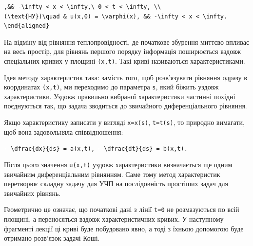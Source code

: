 \documentclass[
  ukrainian,
]{article}
\begin{document}
\begin{verbatim}
,&& -\infty < x < \infty,\ 0 < t < \infty, \\
(\text{НУ})\quad & u(x,0) = \varphi(x), && -\infty < x < \infty.
\end{aligned}
\end{verbatim}

На відміну від рівняння теплопровідності, де початкове збурення миттєво
впливає на весь простір, для рівнянь першого порядку інформація
поширюється вздовж спеціальних кривих у площині \texttt{(x,t)}. Такі
криві називаються характеристиками.

Ідея методу характеристик така: замість того, щоб розв'язувати рівняння
одразу в координатах \texttt{(x,t)}, ми переходимо до параметра
\texttt{s}, який біжить уздовж характеристики. Уздовж правильно вибраної
характеристики частинні похідні поєднуються так, що задача зводиться до
звичайного диференціального рівняння.

Якщо характеристику записати у вигляді \texttt{x=x(s)}, \texttt{t=t(s)},
то природно вимагати, щоб вона задовольняла співвідношення:

\texttt{-\ \textquotesingle{}\textbackslash{}dfrac\{dx\}\{ds\}\ =\ a(x,t)\textquotesingle{},}
\texttt{-\ \textquotesingle{}\textbackslash{}dfrac\{dt\}\{ds\}\ =\ b(x,t)\textquotesingle{}.}

Після цього значення \texttt{u(x,t)} уздовж характеристики визначається
ще одним звичайним диференціальним рівнянням. Саме тому метод
характеристик перетворює складну задачу для УЧП на послідовність
простіших задач для звичайних рівнянь.

Геометрично це означає, що початкові дані з лінії \texttt{t=0} не
розмазуються по всій площині, а переносяться вздовж характеристичних
кривих. У наступному фрагменті лекції ці криві буде побудовано явно, а
тоді з їхньою допомогою буде отримано розв'язок задачі Коші.
\end{document}
